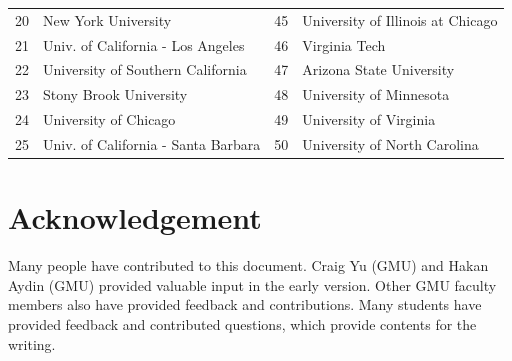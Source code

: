 \documentclass[11pt]{article}
\newcommand{\red}[1]{{\color{red}{#1}}}
\begin{document}
\begin{table}[h!]
\begin{tabular}{rl|rl}
    20 &  New York University  &45& University of Illinois at Chicago  \\
    21 & Univ. of California - Los Angeles &46& Virginia Tech\red{$^*$}  \\
    22 & University of Southern California &47&  Arizona State University\red{$^*$} \\
    23 & Stony Brook University\red{$^*$} &48&University of Minnesota \\
    24 & University of Chicago &49& University of Virginia \\
    25 & Univ. of California - Santa Barbara &50& University of North Carolina\red{$^*$} \\
    \bottomrule
    \end{tabular}
\end{table}

\section{Acknowledgement}

Many people have contributed to this document.
Craig Yu (GMU) and Hakan Aydin (GMU) provided valuable input in the early version. Other GMU faculty members also have provided feedback and contributions.  Many students have provided feedback and contributed questions, which provide contents for the writing.


\newpage
\end{document}
